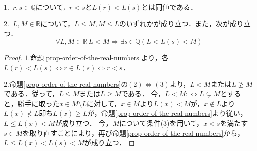 \documentclass[uplatex, 12pt, dvipdfmx]{jsreport}
\begin{document}
\begin{corollary}[実数体の順序]\rm{}\label{corollary-order-of-the-real-numbers}　

    1.\, $r,s\in\mathbb{Q}$について，$r<s$と$L(r)<L(s)$とは同値である．
    
    2.\, $L,M\in\mathbb{R}$について，$L\leq M, M\leq L$のいずれかが成り立つ．また，次が成り立つ．
    \[ \forall L,M\in\mathbb{R} \, L<M \Longrightarrow \exists s\in\mathbb{Q} (L<L(s)<M) \]
\end{corollary}
\begin{proof}\rm{}
    $1.$命題\ref{prop-order-of-the-real-numbers}より，各$L(r)<L(s)\Leftrightarrow r\in L(s)\Leftrightarrow r<s$．

    $2.$命題\ref{prop-order-of-the-real-numbers}の$(2)\Leftrightarrow(3)$より，$L<M$または$L\ngeq M$である．従って，$L\le M$または$L\ge M$である．
    今，$L<M:\Leftrightarrow L\subsetneq M$とすると，勝手に取った$x\in M\setminus L$に対して，$x\in M$より$L(x)<M$が，$x\notin L$より$L(x)\nless L$即ち$L(x)\ge L$が，命題\ref{prop-order-of-the-real-numbers}より従い，$L\le L(x)<M$が成り立つ．
    今，$M$について条件(3)を用いて，$x<s$を満たす$s\in M$を取り直すことにより，再び命題\ref{prop-order-of-the-real-numbers}から，$L\le L(x)<L(s)<M$が成り立つ．
\end{proof}
\end{document}
